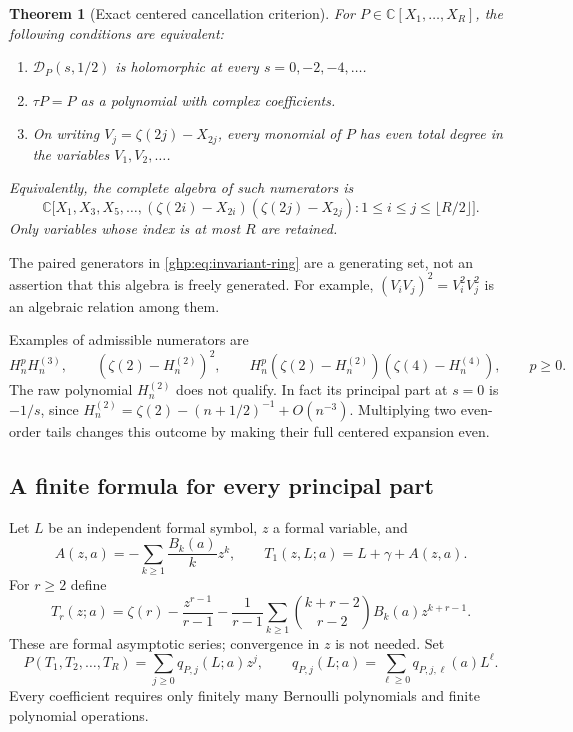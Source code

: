 \documentclass[11pt,a4paper]{article}
\numberwithin{equation}{section}
\newtheorem{theorem}{Theorem}[section]
\theoremstyle{definition}
\theoremstyle{remark}
\begin{document}
\begin{theorem}[Exact centered cancellation criterion]\label{ghp:thm:classification}
For $P\in\mathbb C[X_1,\ldots,X_R]$, the following conditions are
 equivalent:
\begin{enumerate}
\item $\mathcal D_P(s,1/2)$ is holomorphic at every
      $s=0,-2,-4,\ldots$.
\item $\tau P=P$ as a polynomial with complex coefficients.
\item On writing $V_j=\zeta(2j)-X_{2j}$, every monomial of $P$ has
      even total degree in the variables $V_1,V_2,\ldots$.
\end{enumerate}
Equivalently, the complete algebra of such numerators is
\begin{equation}\label{ghp:eq:invariant-ring}
 \mathbb C\bigl[X_1,X_3,X_5,\ldots,
  (\zeta(2i)-X_{2i})(\zeta(2j)-X_{2j}):1\leq i\leq j\leq\lfloor R/2\rfloor\bigr].
\end{equation}
Only variables whose index is at most $R$ are retained.
\end{theorem}

The paired generators in \eqref{ghp:eq:invariant-ring} are a generating
set, not an assertion that this algebra is freely generated. For
example, $(V_iV_j)^2=V_i^2V_j^2$ is an algebraic relation among them.

Examples of admissible numerators are
\[
 H_n^pH_n^{(3)},\qquad
 (\zeta(2)-H_n^{(2)})^2,\qquad
 H_n^p(\zeta(2)-H_n^{(2)})(\zeta(4)-H_n^{(4)}),
 \qquad p\geq0.
\]
The raw polynomial $H_n^{(2)}$ does not qualify. In fact its principal
part at $s=0$ is $-1/s$, since
$H_n^{(2)}=\zeta(2)-(n+1/2)^{-1}+O(n^{-3})$.
Multiplying two even-order tails changes this outcome by making their
full centered expansion even.

\subsection{A finite formula for every principal part}

Let $L$ be an independent formal symbol, $z$ a formal variable, and
\begin{equation}\label{ghp:def:A}
 A(z,a)=-\sum_{k\geq1}\frac{B_k(a)}kz^k,
 \qquad T_1(z,L;a)=L+\gamma+A(z,a).
\end{equation}
For $r\geq2$ define
\begin{equation}\label{ghp:def:Tr}
 T_r(z;a)=\zeta(r)-\frac{z^{r-1}}{r-1}
 -\frac1{r-1}\sum_{k\geq1}
   \binom{k+r-2}{r-2}B_k(a)z^{k+r-1}.
\end{equation}
These are formal asymptotic series; convergence in $z$ is not needed.
Set
\begin{equation}\label{ghp:def:q}
 P(T_1,T_2,\ldots,T_R)=\sum_{j\geq0}q_{P,j}(L;a)z^j,
 \qquad q_{P,j}(L;a)=\sum_{\ell\geq0}q_{P,j,\ell}(a)L^\ell.
\end{equation}
Every coefficient requires only finitely many Bernoulli polynomials and
finite polynomial operations.
\end{document}
